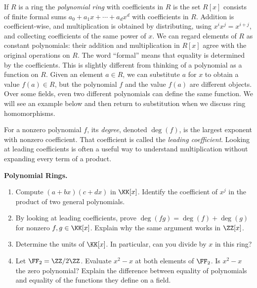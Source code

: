 \documentclass[12pt,reqno]{amsart}
\begin{document}
\hrulefill

If $R$ is a ring the \emph{polynomial ring} with coefficients in $R$ is the set $R[x]$ consists of finite formal sums $a_0+a_1x+\cdots+a_dx^d$ with coefficients in $R$. Addition is coefficient-wise, and multiplication is obtained by distributing, using $x^ix^j=x^{i+j}$, and collecting coefficients of the same power of $x$. We can regard elements of $R$ as constant polynomials: their addition and multiplication in $R[x]$ agree with the original operations on $R$.  The word ``formal'' means that equality is determined by the coefficients.  This is slightly different from thinking of a polynomial as a function on $R$. Given an element $a\in R$, we can substitute $a$ for $x$ to obtain a value $f(a) \in R$, but the polynomial $f$ and the value $f(a)$ are different objects. Over some fields, even two different polynomials can define the same function. We will see an example below and then return to substitution when we discuss ring homomorphisms.

For a nonzero polynomial $f$, its \emph{degree}, denoted $\deg(f)$, is the largest exponent with nonzero coefficient. That coefficient is called the \emph{leading coefficient}. Looking at leading coefficients is often a useful way to understand multiplication without expanding every term of a product.

\hrulefill

\begin{problems}
\item\label{r:polys} \textbf{Polynomial Rings.}
\begin{enumerate}
\item Compute $(a+bx)(c+dx)$ in $\KK[x]$. Identify the coefficient of $x^j$ in the product of two general polynomials.
\item By looking at leading coefficients, prove $\deg(fg)=\deg(f)+\deg(g)$ for nonzero $f,g\in \KK[x]$. Explain why the same argument works in $\ZZ[x]$.
\item Determine the units of $\KK[x]$. In particular, can you divide by $x$ in this ring?
\item Let $\FF_2=\ZZ/2\ZZ$. Evaluate $x^2-x$ at both elements of $\FF_2$. Is $x^2-x$ the zero polynomial? Explain the difference between equality of polynomials and equality of the functions they define on a field.
\end{enumerate}
\end{problems}

\hrulefill
\end{document}
